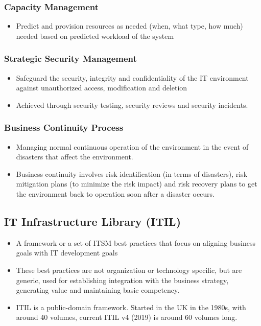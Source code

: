 \documentclass{article}
\begin{document}
\subsubsection{Capacity Management}
\begin{itemize}
    \item Predict and provision resources as needed (when, what type, how much) needed based on predicted workload of the system
\end{itemize}

\subsubsection{Strategic Security Management}
\begin{itemize}
    \item Safeguard the security, integrity and confidentiality of the IT environment against unauthorized access, modification and deletion
    
    \item Achieved through security testing, security reviews and security incidents.
\end{itemize}

\subsubsection{Business Continuity Process}
\begin{itemize}
    \item Managing normal continuous operation of the environment in the event of disasters that affect the environment.
    
    \item Business continuity involves risk identification (in terms of disasters), risk mitigation plans (to minimize the risk impact) and risk recovery plans to get the environment back to operation soon after a disaster occurs.
\end{itemize}

\subsection{IT Infrastructure Library (ITIL)}
\begin{itemize}
    \item A framework or a set of ITSM best practices that focus on aligning business goals with IT development goals
    
    \item These best practices are not organization or technology specific, but are generic, used for establishing integration with the business strategy, generating value and maintaining basic competency.
    
    \item ITIL is a public-domain framework. Started in the UK in the 1980s, with around 40 volumes, current ITIL v4 (2019) is around 60 volumes long.
\end{itemize}
\end{document}
